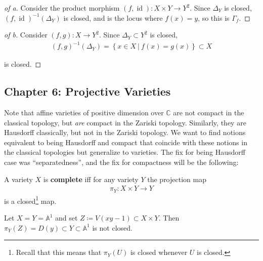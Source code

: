 \begin{proof}[of a]

Consider the product morphism
\((f, \operatorname{id}): X\times Y \to Y^2\). Since \(\Delta_Y\) is
closed, \((f, \operatorname{id})^{-1} (\Delta_Y)\) is closed, and is the
locus where \(f(x) = y\), so this is \(\Gamma_f\).

\end{proof}

\begin{proof}[of b]

Consider \((f, g): X\to Y^2\). Since \(\Delta_Y \subset Y^2\) is closed,
\begin{align*}
(f, g)^{-1}(\Delta_Y) = \left\{{x\in X {~\mathrel{\Big|}~}f(x) = g(x)}\right\} \subset X
\end{align*}

is closed.

\end{proof}

\hypertarget{chapter-6-projective-varieties}{%
\subsection{Chapter 6: Projective
Varieties}\label{chapter-6-projective-varieties}}

Note that affine varieties of positive dimension over \({\mathbb{C}}\)
are not compact in the classical topology, but \emph{are} compact in the
Zariski topology. Similarly, they are Hausdorff classically, but not in
the Zariski topology. We want to find notions equivalent to being
Hausdorff and compact that coincide with these notions in the classical
topologies but generalize to varieties. The fix for being Hausdorff case
was ``separatedness'', and the fix for compactness will be the
following:

\begin{definition}[Complete]

A variety \(X\) is \textbf{complete} iff for any variety \(Y\) the
projection map
\begin{align*}
\pi_Y:X\times Y\to Y
\end{align*}
is a closed\footnote{Recall that this means that \(\pi_Y(U)\) is closed
  whenever \(U\) is closed.} map.

\end{definition}

\begin{example}

Let \(X = Y={\mathbb{A}}^1\) and set
\(Z \coloneqq V(xy-1)\subset X\times Y\). Then
\(\pi_Y(Z) = D(y) \subset Y \subset {\mathbb{A}}^1\) is not closed.

\end{example}

